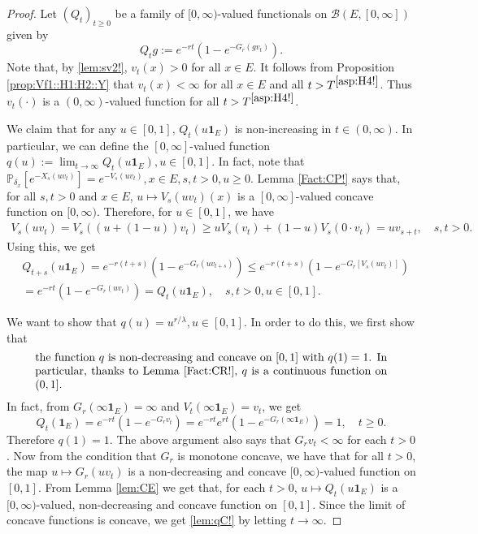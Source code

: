 \documentclass[12pt,a4paper]{amsart}
\numberwithin{equation}{section}
\theoremstyle{plain}
\theoremstyle{definition}
\theoremstyle{remark}
\begin{document}
\begin{proof}
	Let $(Q_t)_{t\geq 0}$ be a family of $[0,\infty)$-valued functionals on $\mathcal B(E,[0,\infty])$ given by
\[
	Q_tg
	:= e^{- r t}( 1 - e^{-G_r(gv_t)} ).
\]
	Note that, by \eqref{lem:sv2!}, $v_t(x)>0$ for all $x\in E$.
	It follows  from Proposition \ref{prop:Vf1::H1:H2::Y} that $v_t(x)<\infty$ for all $x\in E$ and all $t> T^{\eqref{asp:H4!}}$.
	Thus $v_t(\cdot)$ is a $(0,\infty)$-valued function for all $t> T^{\eqref{asp:H4!}}$.

	We claim that for any $u \in [0,1]$, $Q_t(u \mathbf 1_E)$ is non-increasing in $t\in (0,\infty)$.
	In particular, we can define the $[0,\infty]$-valued function $q(u):= \lim_{t\to \infty} Q_t(u \mathbf 1_E), u\in [0,1]$.
	In fact, note that $\mathbb P_{\delta_x}[e^{- X_s(uv_t)}] = e^{-V_s(uv_t)},x\in E, s,t>0, u \geq 0$.
	Lemma \ref{Fact:CP!} says that, for all $s,t > 0$ and $x\in E$, $u\mapsto V_s(uv_t)(x) $ is a $[0,\infty]$-valued concave function on $[0,\infty)$.
	Therefore, for $u\in [0,1]$, we have
\begin{align}
	V_s(uv_t)
	=V_s((u+ (1-u))v_t)
	\geq uV_s(v_t) + (1-u) V_s(0\cdot v_t)
	= uv_{s+t},
	\quad s,t > 0.
\end{align}
	Using this, we get
\begin{align}
	& Q_{t+s}(u \mathbf 1_E)
	= e^{- r (t+s)} ( 1-e^{-G_r(uv_{t+s})} )
	\leq e^{- r(t+s)}( 1-e^{-G_r[V_s(uv_t)]} ) \\
	& = e^{-r t}( 1-e^{-G_r(uv_t)} )
	= Q_t(u \mathbf 1_E),
	\quad s,t > 0, u \in [0,1].
\end{align}

	We want to show that $q(u)= u^{r/\lambda}, u\in [0,1]$.
	In order to do this, we first show that
\begin{equation} \label{lem:qC!}
\begin{minipage}{0.9\textwidth}
	the function $q$ is non-decreasing and concave on $[0,1]$ with $q(1) = 1$.
	In particular, thanks to Lemma \ref{Fact:CR!}, $q$ is a continuous function on $(0,1]$.
\end{minipage}
\end{equation}
	In fact, from $G_r(\infty  \mathbf 1_E) = \infty$ and $V_t(\infty  \mathbf 1_E) = v_t$, we get
	\[
	Q_t( \mathbf 1_E)
	= e^{- r t} ( 1-e^{-G_r v_t} )
	= e^{- r t} e^{r t}( 1-e^{-G_r (\infty\mathbf 1_E)} )
	= 1,
	\quad t\geq 0.
	\]
	Therefore $q(1) = 1$.
	The above argument also says that $G_r v_t < \infty$ for each $t>0$.
	Now from the condition that $G_r$ is monotone concave, we have that for all $t>0$, the map $u \mapsto G_r(uv_t)$ is a non-decreasing and concave $[0,\infty)$-valued function on $[0,1]$.
	From Lemma \ref{lem:CE} we get that, for each $t> 0$, $u \mapsto Q_t(u  \mathbf 1_E)$ is a $[0,\infty)$-valued, non-decreasing and concave function on $[0,1]$.
	Since the limit of concave functions is concave, we get \eqref{lem:qC!} by letting $t\to \infty$.


\end{proof}
\end{document}

